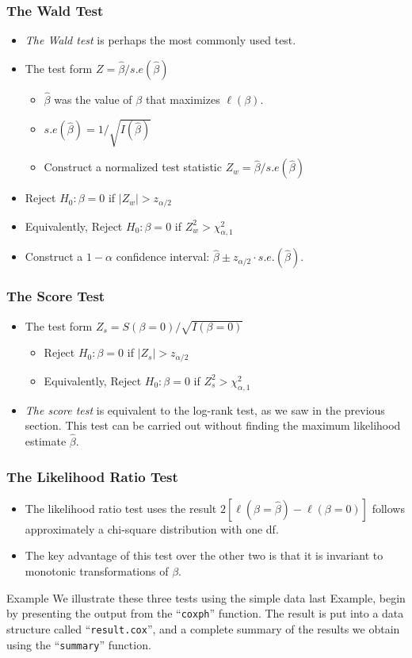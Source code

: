 \documentclass{beamer}
\newcommand{\empr}[1]{{\emph{\color{red}#1}}}
\begin{document}
\pagebreak
\begin{frame}
\frametitle{The Wald Test}
\begin{itemize}
\item \empr{The Wald test} is perhaps the most commonly used test.
\item The test form $Z = \hat{\beta}/s.e(\hat{\beta})$
\begin{itemize}
\item $\hat{\beta}$ was the value of $\beta$ that maximizes $\ell(\beta)$.
\item  $s.e(\hat{\beta}) = 1/\sqrt{I(\hat{\beta})}$
\item  Construct a normalized test statistic $Z_w = \hat{\beta}/s.e(\hat{\beta})$
\end{itemize}
\item Reject $H_0: \beta=0$ if $|Z_w| > z_{\alpha/2}$
\item Equivalently, Reject $H_0: \beta=0$ if $Z _{w}^{2} > \chi _{\alpha,1}^{2}$
\item Construct a $1-\alpha$ confidence interval: $\hat{\beta}\pm z_{\alpha/2}\cdot s.e.(\hat{\beta})$.
\end{itemize}
\end{frame}

\pagebreak
\begin{frame}
\frametitle{The Score Test}
\begin{itemize}
\item The test form $Z_s = S(\beta = 0)/\sqrt{I(\beta = 0)}$
\begin{itemize}
 \item Reject $H_0: \beta=0$ if $|Z_s| > z_{\alpha/2}$
	\item Equivalently, Reject $H_0: \beta=0$ if $Z _{s}^{2} > \chi _{\alpha,1}^{2}$
\end{itemize}
\item \empr{The score test} is equivalent to the {\color{red}log-rank test}, as we saw in the previous section. This test can be carried out without finding the maximum likelihood estimate $\hat{\beta}$.
	\end{itemize}
\end{frame}

\pagebreak
\begin{frame}
\frametitle{The Likelihood Ratio Test}
\begin{itemize}
\item The likelihood ratio test uses the result \empr{ $2[\ell(\beta=\hat{\beta}) - \ell(\beta=0)]$} follows approximately a chi-square distribution with one df.
\item The key {\color{red}advantage} of this test over the other two is that it is invariant to monotonic transformations of $\beta$.
\end{itemize}
\begin{problock}{Example}
We illustrate these three tests using the simple data last Example, begin by presenting the output from the  ``\texttt{coxph}'' function. The result is put into a data structure called ``\texttt{result.cox}'', and a complete summary of the results we obtain using the ``\texttt{summary}'' function.
\end{problock}
\end{frame}
\end{document}
